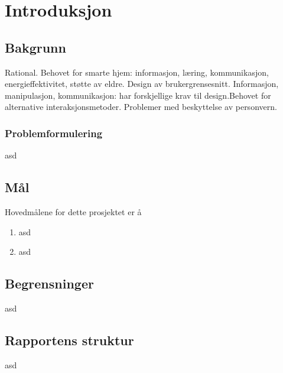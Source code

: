 \section[Introduksjon]{Introduksjon}
\subsection{Bakgrunn}
Rational.
Behovet for smarte hjem: informasjon, læring, kommunikasjon, energieffektivitet, støtte av eldre. Design av brukergrensesnitt. Informasjon, manipulasjon, kommunikasjon: har forskjellige krav til design.Behovet for alternative interaksjonsmetoder. Problemer med beskyttelse av personvern.

\subsubsection*{Problemformulering}
asd

\subsection{Mål}
Hovedmålene for dette prosjektet er å
\begin{enumerate}
\item asd
\item asd
\end{enumerate}

\subsection{Begrensninger}
asd

\subsection{Rapportens struktur}
asd